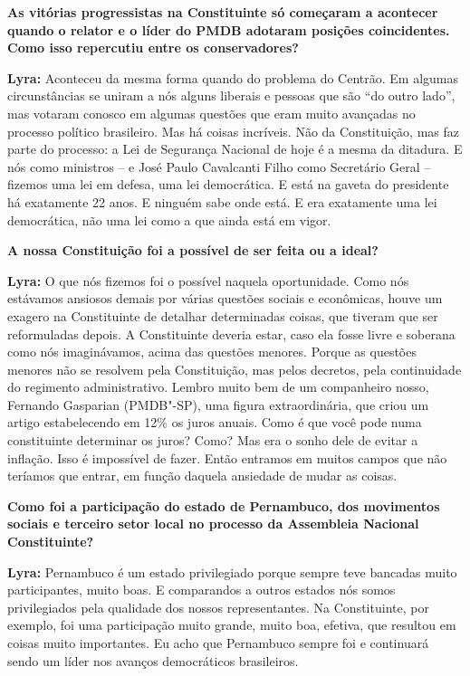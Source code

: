 \textbf{As vitórias progressistas na Constituinte só começaram a
acontecer quando o relator e o líder do PMDB adotaram posições
coincidentes. Como isso repercutiu entre os conservadores?}

\textbf{Lyra:} Aconteceu da mesma forma quando do problema do Centrão.
Em algumas circunstâncias se uniram a nós alguns liberais e pessoas que
são ``do outro lado'', mas votaram conosco em algumas questões que eram
muito avançadas no processo político brasileiro. Mas há coisas
incríveis. Não da Constituição, mas faz parte do processo: a Lei de
Segurança Nacional de hoje é a mesma da ditadura. E nós como ministros
-- e José Paulo Cavalcanti Filho como Secretário Geral -- fizemos uma
lei em defesa, uma lei democrática. E está na gaveta do presidente há
exatamente 22 anos. E ninguém sabe onde está. E era exatamente uma lei
democrática, não uma lei como a que ainda está em vigor.

\textbf{A nossa Constituição foi a possível de ser feita ou a ideal?}

\textbf{Lyra:} O que nós fizemos foi o possível naquela oportunidade.
Como nós estávamos ansiosos demais por várias questões sociais e
econômicas, houve um exagero na Constituinte de detalhar determinadas
coisas, que tiveram que ser reformuladas depois. A Constituinte deveria
estar, caso ela fosse livre e soberana como nós imaginávamos, acima das
questões menores. Porque as questões menores não se resolvem pela
Constituição, mas pelos decretos, pela continuidade do regimento
administrativo. Lembro muito bem de um companheiro nosso, Fernando
Gasparian (PMDB"-SP), uma figura extraordinária, que criou um artigo
estabelecendo em 12\% os juros anuais. Como é que você pode numa
constituinte determinar os juros? Como? Mas era o sonho dele de evitar a
inflação. Isso é impossível de fazer. Então entramos em muitos campos
que não teríamos que entrar, em função daquela ansiedade de mudar as
coisas.

\textbf{Como foi a participação do estado de Pernambuco, dos movimentos
sociais e terceiro setor local no processo da Assembleia Nacional
Constituinte?}

\textbf{Lyra:} Pernambuco é um estado privilegiado porque sempre teve
bancadas muito participantes, muito boas. E comparandos a outros estados
nós somos privilegiados pela qualidade dos nossos representantes. Na
Constituinte, por exemplo, foi uma participação muito grande, muito boa,
efetiva, que resultou em coisas muito importantes. Eu acho que
Pernambuco sempre foi e continuará sendo um líder nos avanços
democráticos brasileiros.

